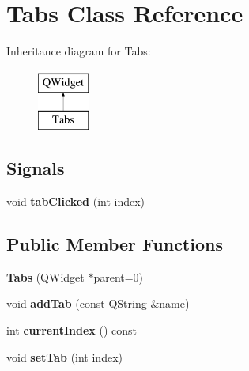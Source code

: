 \hypertarget{class_tabs}{\section{Tabs Class Reference}
\label{class_tabs}
}
Inheritance diagram for Tabs\-:\begin{figure}[H]
\begin{center}
\leavevmode
\includegraphics[height=2.000000cm]{class_tabs}
\end{center}
\end{figure}
\subsection*{Signals}
\begin{DoxyCompactItemize}
\item 
\hypertarget{class_tabs_aa237ef9367b0331dc6a8d79b747fbb2c}{void {\bfseries tab\-Clicked} (int index)}\label{class_tabs_aa237ef9367b0331dc6a8d79b747fbb2c}

\end{DoxyCompactItemize}
\subsection*{Public Member Functions}
\begin{DoxyCompactItemize}
\item 
\hypertarget{class_tabs_a39c699b0149876d9cf8d5c70180b4eef}{{\bfseries Tabs} (Q\-Widget $\ast$parent=0)}\label{class_tabs_a39c699b0149876d9cf8d5c70180b4eef}

\item 
\hypertarget{class_tabs_ac5b4bda9917f01ff5d6bda24480cd405}{void {\bfseries add\-Tab} (const Q\-String \&name)}\label{class_tabs_ac5b4bda9917f01ff5d6bda24480cd405}

\item 
\hypertarget{class_tabs_a687918b0ffaed27b9ce73543572d92e7}{int {\bfseries current\-Index} () const }\label{class_tabs_a687918b0ffaed27b9ce73543572d92e7}

\item 
\hypertarget{class_tabs_a7f81392fe0f5fb31a5d466296602692c}{void {\bfseries set\-Tab} (int index)}\label{class_tabs_a7f81392fe0f5fb31a5d466296602692c}

\end{DoxyCompactItemize}
